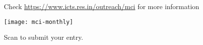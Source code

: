 \documentclass[a4paper,12pt]{article}
\begin{document}
\centering
\begin{minipage}{0.8\textwidth}
    \vspace{3cm}
Check \url{https://www.icts.res.in/outreach/mci} for more information
\end{minipage}
\begin{minipage}{0.8\textwidth}
    \vspace{3cm}
    \centering
    \texttt{[image: mci-monthly]}

    Scan to submit your entry.
\end{minipage}
\end{document}
